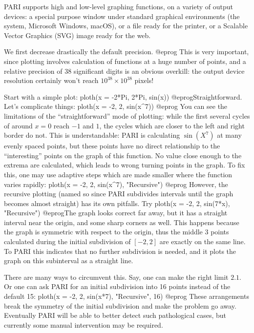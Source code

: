 PARI supports high and low-level graphing functions, on a variety of output
devices: a special purpose window under standard graphical environments (the
 system, Microsoft Windows, macOS), or a 
file ready for the printer, or a Scalable Vector Graphics (SVG) image
ready for the web.


We first decrease drastically the default precision.
\bprog
@eprog\noindent
This is very important, since plotting involves calculation of functions at
a huge number of points, and a relative precision of 38 significant digits
is an obvious overkill: the output device resolution certainly won't reach
$10^{38} \times 10^{38}$ pixels!

Start with a simple plot:
\bprog
  ploth(x = -2*Pi, 2*Pi, sin(x))
@eprog\noindent Straightforward. Let's complicate things:
\bprog
  ploth(x = -2, 2, sin(x^7))
@eprog\noindent
You can see the limitations of the ``straightforward'' mode of plotting:
while the first several cycles of  around $x = 0$ reach $-1$ and
$1$, the cycles which are closer to the left and right border do not. This is
understandable: PARI is calculating $\sin(X^7)$ at many evenly spaced
points, but these points have no direct relationship to the ``interesting''
points on the graph of this function.  No value close enough to the extrema
are calculated, which leads to wrong turning points in the graph.
To fix this, one may use adaptive steps which are made smaller where the
function varies rapidly:
\bprog
  ploth(x = -2, 2, sin(x^7), "Recursive")
@eprog\noindent
However, the recursive plotting (named so since PARI subdivides intervals
until the graph becomes almost straight) has its own pitfalls.  Try
\bprog
  ploth(x = -2, 2, sin(7*x), "Recursive")
@eprog\noindent The graph looks correct far away, but it has a straight
interval near the origin, and some sharp corners as well.  This happens
because the graph is symmetric with respect to the origin, thus the middle 3
points calculated during the initial subdivision of $[-2,2]$ are exactly on
the same line.  To PARI this indicates that no further subdivision is needed,
and it plots the graph on this subinterval as a straight line.

There are many ways to circumvent this.  Say, one can make the right limit
$2.1$.  Or one can ask PARI for an initial subdivision into 16 points instead
of the default 15:
\bprog
  ploth(x = -2, 2, sin(x*7), "Recursive", 16)
@eprog\noindent
These arrangements break the symmetry of the initial subdivision and
make the problem go away.  Eventually PARI will be able to better detect such
pathological cases, but currently some manual intervention may be required.

